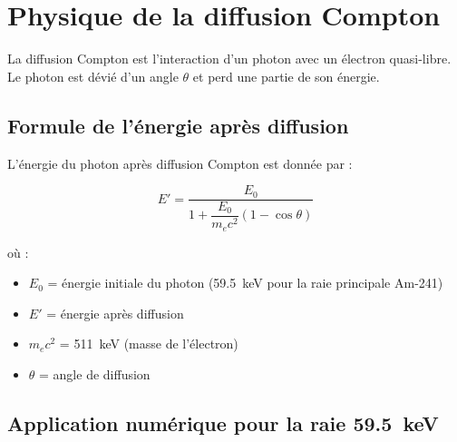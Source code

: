 \documentclass[11pt,a4paper]{article}
\begin{document}
\section{Physique de la diffusion Compton}

La diffusion Compton est l'interaction d'un photon avec un électron quasi-libre. Le photon est dévié d'un angle $\theta$ et perd une partie de son énergie.

\subsection{Formule de l'énergie après diffusion}

L'énergie du photon après diffusion Compton est donnée par :

\begin{equation}
\boxed{E' = \frac{E_0}{1 + \dfrac{E_0}{m_e c^2}(1 - \cos\theta)}}
\label{eq:compton}
\end{equation}

où :
\begin{itemize}
    \item $E_0$ = énergie initiale du photon (59.5~keV pour la raie principale Am-241)
    \item $E'$ = énergie après diffusion
    \item $m_e c^2$ = 511~keV (masse de l'électron)
    \item $\theta$ = angle de diffusion
\end{itemize}

\subsection{Application numérique pour la raie 59.5~keV}
\end{document}

